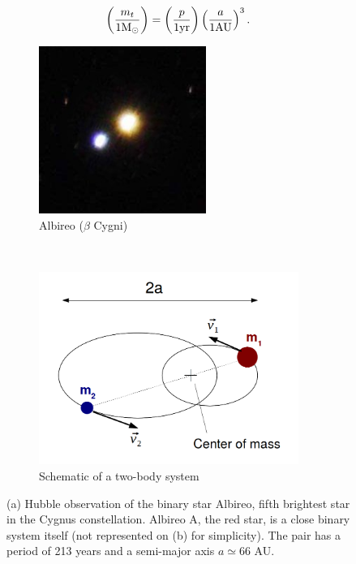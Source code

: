 \begin{equation}
\left( \frac{m_t}{1 {\textrm{M}_\odot}} \right) = \left( \frac{p}{1 \textrm{yr}} \right) \left( \frac{a}{1 \textrm{AU}} \right)^3 .
\end{equation}



\begin{figure}
\center
    \centering
    \begin{subfigure}[b]{0.48\textwidth}
    	\centering
        \includegraphics[width=0.6\textwidth]{Figures/0_albireo.jpg}
        \caption{Albireo ($\beta$ Cygni)}
        \label{Fig:0_binary_1}
    \end{subfigure}
    ~~
    \begin{subfigure}[b]{0.48\textwidth}
    	\centering
        \includegraphics[width=0.93\textwidth]{Figures/0_elliptictrajectories.png}
        \caption{Schematic of a two-body system}
        \label{Fig:0_binary_2}
    \end{subfigure}
\caption{(a) Hubble observation of the binary star Albireo, fifth brightest star in the Cygnus constellation. Albireo A, the red star, is a close binary system itself (not represented on (b) for simplicity). The pair has a period of 213 years and a semi-major axis $a \simeq 66$ AU. }
\label{Fig:0_binary}
\end{figure}






